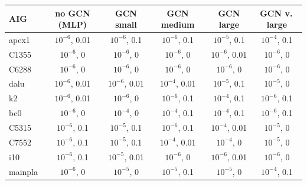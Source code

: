 \begin{tabular}{lccccc}
\toprule
AIG & no GCN (MLP) & GCN small & GCN medium & GCN large & GCN v.\,large \\
\midrule
apex1 & $10^{-6}$, 0.01 & $10^{-6}$, 0.1 & $10^{-6}$, 0.1 & $10^{-5}$, 0.1 & $10^{-4}$, 0.1 \\
C1355 & $10^{-6}$, 0 & $10^{-6}$, 0 & $10^{-6}$, 0 & $10^{-6}$, 0.01 & $10^{-6}$, 0 \\
C6288 & $10^{-6}$, 0 & $10^{-6}$, 0 & $10^{-6}$, 0 & $10^{-6}$, 0 & $10^{-6}$, 0 \\
dalu & $10^{-6}$, 0.01 & $10^{-6}$, 0.01 & $10^{-4}$, 0.01 & $10^{-5}$, 0.1 & $10^{-5}$, 0 \\
k2 & $10^{-6}$, 0.01 & $10^{-6}$, 0 & $10^{-6}$, 0.1 & $10^{-4}$, 0.1 & $10^{-6}$, 0.1 \\
bc0 & $10^{-6}$, 0 & $10^{-4}$, 0 & $10^{-4}$, 0.1 & $10^{-4}$, 0.1 & $10^{-6}$, 0.1 \\
C5315 & $10^{-6}$, 0.1 & $10^{-5}$, 0.1 & $10^{-6}$, 0.1 & $10^{-4}$, 0.01 & $10^{-5}$, 0 \\
C7552 & $10^{-6}$, 0.1 & $10^{-5}$, 0.1 & $10^{-4}$, 0.01 & $10^{-4}$, 0 & $10^{-5}$, 0 \\
i10 & $10^{-6}$, 0.1 & $10^{-5}$, 0.01 & $10^{-6}$, 0 & $10^{-6}$, 0.01 & $10^{-6}$, 0 \\
mainpla & $10^{-6}$, 0 & $10^{-5}$, 0 & $10^{-5}$, 0.1 & $10^{-5}$, 0 & $10^{-4}$, 0.1 \\
\bottomrule
\end{tabular}
